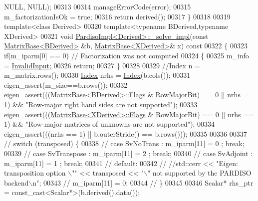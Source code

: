\begin{DoxyCode}
      NULL, NULL);
00313   
00314   manageErrorCode(error);
00315   m\_factorizationIsOk = \textcolor{keyword}{true};
00316   \textcolor{keywordflow}{return} derived();
00317 \}
00318 
00319 \textcolor{keyword}{template}<\textcolor{keyword}{class} Derived>
00320 \textcolor{keyword}{template}<\textcolor{keyword}{typename} BDerived,\textcolor{keyword}{typename} XDerived>
00321 \textcolor{keywordtype}{void} \hyperlink{class_eigen_1_1_pardiso_impl}{PardisoImpl<Derived>::\_solve\_impl}(\textcolor{keyword}{const} 
      \hyperlink{group___core___module_class_eigen_1_1_matrix_base}{MatrixBase<BDerived>} &b, \hyperlink{group___core___module_class_eigen_1_1_matrix_base}{MatrixBase<XDerived>}& x)\textcolor{keyword}{ const}
00322 \textcolor{keyword}{}\{
00323   \textcolor{keywordflow}{if}(m\_iparm[0] == 0) \textcolor{comment}{// Factorization was not computed}
00324   \{
00325     m\_info = \hyperlink{group__enums_gga85fad7b87587764e5cf6b513a9e0ee5ea945604f62795ffc70aedf2bd12ea0434}{InvalidInput};
00326     \textcolor{keywordflow}{return};
00327   \}
00328 
00329   \textcolor{comment}{//Index n = m\_matrix.rows();}
00330   \hyperlink{namespace_eigen_a62e77e0933482dafde8fe197d9a2cfde}{Index} nrhs = \hyperlink{namespace_eigen_a62e77e0933482dafde8fe197d9a2cfde}{Index}(b.cols());
00331   eigen\_assert(m\_size==b.rows());
00332   eigen\_assert(((\hyperlink{group___core___module_class_eigen_1_1_matrix_base}{MatrixBase<BDerived>::Flags} & 
      \hyperlink{group__flags_gae4f56c2a60bbe4bd2e44c5b19cbe8762}{RowMajorBit}) == 0 || nrhs == 1) && \textcolor{stringliteral}{"Row-major right hand sides are not supported"});
00333   eigen\_assert(((\hyperlink{group___core___module_class_eigen_1_1_matrix_base}{MatrixBase<XDerived>::Flags} & RowMajorBit) == 0 || nrhs == 1) 
      && \textcolor{stringliteral}{"Row-major matrices of unknowns are not supported"});
00334   eigen\_assert(((nrhs == 1) || b.outerStride() == b.rows()));
00335 
00336 
00337 \textcolor{comment}{//  switch (transposed) \{}
00338 \textcolor{comment}{//    case SvNoTrans    : m\_iparm[11] = 0 ; break;}
00339 \textcolor{comment}{//    case SvTranspose  : m\_iparm[11] = 2 ; break;}
00340 \textcolor{comment}{//    case SvAdjoint    : m\_iparm[11] = 1 ; break;}
00341 \textcolor{comment}{//    default:}
00342 \textcolor{comment}{//      //std::cerr << "Eigen: transposition  option \(\backslash\)"" << transposed << "\(\backslash\)" not supported by the PARDISO
       backend\(\backslash\)n";}
00343 \textcolor{comment}{//      m\_iparm[11] = 0;}
00344 \textcolor{comment}{//  \}}
00345 
00346   Scalar* rhs\_ptr = \textcolor{keyword}{const\_cast<}Scalar*\textcolor{keyword}{>}(b.derived().data());

\end{DoxyCode}
